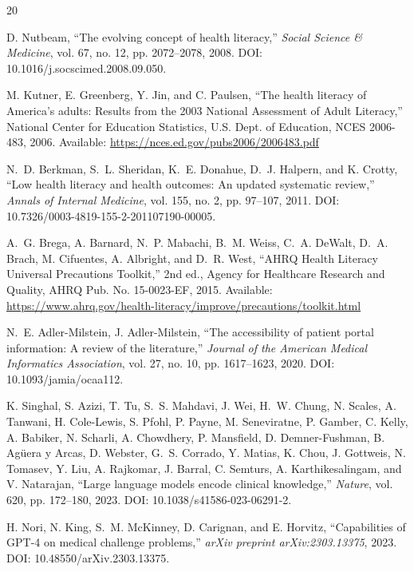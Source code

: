 \documentclass[conference]{IEEEtran}
\begin{document}
\begin{thebibliography}{20}

D. Nutbeam, ``The evolving concept of health literacy,'' \textit{Social Science \& Medicine}, vol. 67, no. 12, pp. 2072--2078, 2008. DOI: 10.1016/j.socscimed.2008.09.050.

M. Kutner, E. Greenberg, Y. Jin, and C. Paulsen, ``The health literacy of America's adults: Results from the 2003 National Assessment of Adult Literacy,'' National Center for Education Statistics, U.S. Dept. of Education, NCES 2006-483, 2006. Available: \url{https://nces.ed.gov/pubs2006/2006483.pdf}

N.~D. Berkman, S.~L. Sheridan, K.~E. Donahue, D.~J. Halpern, and K. Crotty, ``Low health literacy and health outcomes: An updated systematic review,'' \textit{Annals of Internal Medicine}, vol. 155, no. 2, pp. 97--107, 2011. DOI: 10.7326/0003-4819-155-2-201107190-00005.

A.~G. Brega, A. Barnard, N.~P. Mabachi, B.~M. Weiss, C.~A. DeWalt, D.~A. Brach, M. Cifuentes, A. Albright, and D.~R. West, ``AHRQ Health Literacy Universal Precautions Toolkit,'' 2nd ed., Agency for Healthcare Research and Quality, AHRQ Pub. No. 15-0023-EF, 2015. Available: \url{https://www.ahrq.gov/health-literacy/improve/precautions/toolkit.html}

N.~E. Adler-Milstein, J. Adler-Milstein, ``The accessibility of patient portal information: A review of the literature,'' \textit{Journal of the American Medical Informatics Association}, vol. 27, no. 10, pp. 1617--1623, 2020. DOI: 10.1093/jamia/ocaa112.

K. Singhal, S. Azizi, T. Tu, S.~S. Mahdavi, J. Wei, H.~W. Chung, N. Scales, A. Tanwani, H. Cole-Lewis, S. Pfohl, P. Payne, M. Seneviratne, P. Gamber, C. Kelly, A. Babiker, N. Scharli, A. Chowdhery, P. Mansfield, D. Demner-Fushman, B. Agüera y Arcas, D. Webster, G.~S. Corrado, Y. Matias, K. Chou, J. Gottweis, N. Tomasev, Y. Liu, A. Rajkomar, J. Barral, C. Semturs, A. Karthikesalingam, and V. Natarajan, ``Large language models encode clinical knowledge,'' \textit{Nature}, vol. 620, pp. 172--180, 2023. DOI: 10.1038/s41586-023-06291-2.

H. Nori, N. King, S.~M. McKinney, D. Carignan, and E. Horvitz, ``Capabilities of GPT-4 on medical challenge problems,'' \textit{arXiv preprint arXiv:2303.13375}, 2023. DOI: 10.48550/arXiv.2303.13375.


\end{thebibliography}
\end{document}
